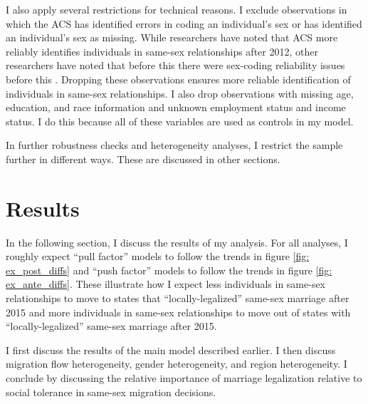 \documentclass[12pt,letterpaper]{article}
\begin{document}
I also apply several restrictions for technical reasons. I exclude observations in which the ACS has identified errors in coding an individual’s sex or has identified an individual’s sex as missing. While researchers have noted that ACS more reliably identifies individuals in same-sex relationships after 2012, other researchers have noted that before this there were sex-coding reliability issues before this \citep{3, 5, 7, 12}. Dropping these observations ensures more reliable identification of individuals in same-sex relationships. I also drop observations with missing age, education, and race information and unknown employment status and income status. I do this because all of these variables are used as controls in my model.

\begin{landscape}
\begin{centering}
\begin{scriptsize}

\end{scriptsize}
\end{centering}
\end{landscape}

In further robustness checks and heterogeneity analyses, I restrict the sample further in different ways. These are discussed in other sections. 

\clearpage

\section{Results}
In the following section, I discuss the results of my analysis. For all analyses, I roughly expect “pull factor” models to follow the trends in figure \ref{fig: ex_post_diffs} and “push factor” models to follow the trends in figure \ref{fig: ex_ante_diffs}. These illustrate how I expect less individuals in same-sex relationships to move to states that “locally-legalized” same-sex marriage after 2015 and more individuals in same-sex relationships to move out of states with “locally-legalized” same-sex marriage after 2015. 

I first discuss the results of the main model described earlier. I then discuss migration flow heterogeneity, gender heterogeneity, and region heterogeneity. I conclude by discussing the relative importance of marriage legalization relative to social tolerance in same-sex migration decisions.
\end{document}
